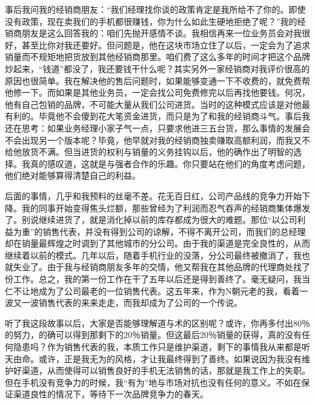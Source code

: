 事后我问我的经销商朋友：“我们经理找你谈的政策肯定是我所给不了你的。即使没有政策，现在卖我们的手机都很赚钱，你为什么如此生硬地拒绝了呢？”我的经销商朋友是这么回答我的：咱们先抛开感情不谈。我相信再来一位业务员会对我很好，甚至比你对我还要好。但问题是，他在这块市场立住了以后，一定会为了追求销量而不规矩地把货放到其他经销商那里。咱们费了这么多年的时间才把这个品牌炒起来，“钱道”都没了，我还要钱干什么呢？其实另外一家经销商对我评价很高的原因也很简单。我在解决他的售后问题时，如果能够变通一下不收费的，就免费帮他修一下。而如果是其他业务员，一定会找公司免费修完以后再找他要钱。何况，他有自己包销的品牌，不可能大量从我们公司进货。当时的这种模式应该是对他最有利的。毕竟他不会傻到花大笔资金进货，而只是为了和我的经销商斗气。事后我还在思考：如果业务经理小家子气一点，只要求他进三五台货，那么事情的发展会不会出现另一个版本呢？毕竟，他早就对我的经销商独卖赚取高额利润，而我又不给他放货不满。但当进货的权利与销量的义务挂钩以后，他的确作出了明智的选择。我真的感叹道，这就是与强者合作的乐趣。你只要站在他们的角度考虑问题，他们绝对能够算得清楚自己的利益。

后面的事情，几乎和我预料的丝毫不差。花无百日红，公司产品线的竞争力开始下降。我的同事开始变得焦头烂额，那些曾经为了利润而忍气吞声的经销商集体爆发了。别说继续进货了，就是消化掉以前的库存都成为很大的难题。那位“以公司利益为重”的销售代表，并没有得到公司的谅解，不得不离开公司，而我们的总经理却在销量最辉煌之时调到了其他城市的分公司。由于我的渠道是完全良性的，从而继续着以前的模式。几年以后，随着手机行业的没落，分公司最终被撤消了，我也就失业了。由于我与经销商朋友多年的交情，他又帮我在其他品牌的代理商处找了份工作。总之，我的第一份工作在干了五年以后还是得到善终了。毫无疑问，我当仁不让地成为了公司最老的一位销售代表。这五年来，作为N朝元老的我，看着一波又一波销售代表的来来走走，而我却成为了公司的一个传说。

听了我这段故事以后，大家是否能够理解道与术的区别呢？或许，你再多付出80％的努力，的确可以得到那剩下的20％销量。但这最后20％销量的获得，真的没有任何隐患吗？作为销售代表的我，本质工作只是维护渠道，剩下的事情我从来都是听天由命。或许，正是我无为的风格，才让我最终得到了善终。如果说因为我没有维护好渠道，从而使得可以销售良好的手机无法销售的话，那就是我工作上的失职。但在手机没有竞争力的时候，我“有为”地与市场对抗也没有任何的意义。不如在保证渠道良性的情况下，等待下一次品牌竞争力的春天。

